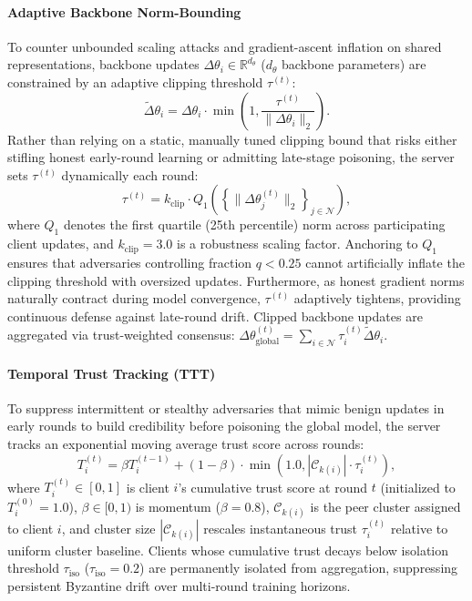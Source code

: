 \paragraph{Adaptive Backbone Norm-Bounding}
To counter unbounded scaling attacks and gradient-ascent inflation on shared representations, backbone updates $\Delta \theta_i \in \mathbb{R}^{d_\theta}$ ($d_\theta$ backbone parameters) are constrained by an adaptive clipping threshold $\tau^{(t)}$:
\begin{equation}
\label{eq:norm_clip}
\tilde{\Delta} \theta_i = \Delta \theta_i \cdot \min\left(1, \frac{\tau^{(t)}}{\|\Delta \theta_i\|_2}\right).
\end{equation}
Rather than relying on a static, manually tuned clipping bound that risks either stifling honest early-round learning or admitting late-stage poisoning, the server sets $\tau^{(t)}$ dynamically each round:
\begin{equation}
\label{eq:q1_clip}
\tau^{(t)} = k_{\mathrm{clip}} \cdot Q_1\left(\left\{\|\Delta \theta_j^{(t)}\|_2\right\}_{j \in \mathcal{N}}\right),
\end{equation}
where $Q_1$ denotes the first quartile (25th percentile) norm across participating client updates, and $k_{\mathrm{clip}} = 3.0$ is a robustness scaling factor. Anchoring to $Q_1$ ensures that adversaries controlling fraction $q < 0.25$ cannot artificially inflate the clipping threshold with oversized updates. Furthermore, as honest gradient norms naturally contract during model convergence, $\tau^{(t)}$ adaptively tightens, providing continuous defense against late-round drift. Clipped backbone updates are aggregated via trust-weighted consensus: $\Delta \theta_{\mathrm{global}}^{(t)} = \sum_{i \in \mathcal{N}} \tau_i^{(t)} \tilde{\Delta} \theta_i$.

\paragraph{Temporal Trust Tracking (TTT)}
To suppress intermittent or stealthy adversaries that mimic benign updates in early rounds to build credibility before poisoning the global model, the server tracks an exponential moving average trust score across rounds:
\begin{equation}
\label{eq:ttt}
T_i^{(t)} = \beta T_i^{(t-1)} + (1 - \beta) \cdot \min\left(1.0, |\mathcal{C}_{k(i)}| \cdot \tau_i^{(t)}\right),
\end{equation}
where $T_i^{(t)} \in [0, 1]$ is client $i$'s cumulative trust score at round $t$ (initialized to $T_i^{(0)} = 1.0$), $\beta \in [0, 1)$ is momentum ($\beta = 0.8$), $\mathcal{C}_{k(i)}$ is the peer cluster assigned to client $i$, and cluster size $|\mathcal{C}_{k(i)}|$ rescales instantaneous trust $\tau_i^{(t)}$ relative to uniform cluster baseline. Clients whose cumulative trust decays below isolation threshold $\tau_{\mathrm{iso}}$ ($\tau_{\mathrm{iso}} = 0.2$) are permanently isolated from aggregation, suppressing persistent Byzantine drift over multi-round training horizons.

